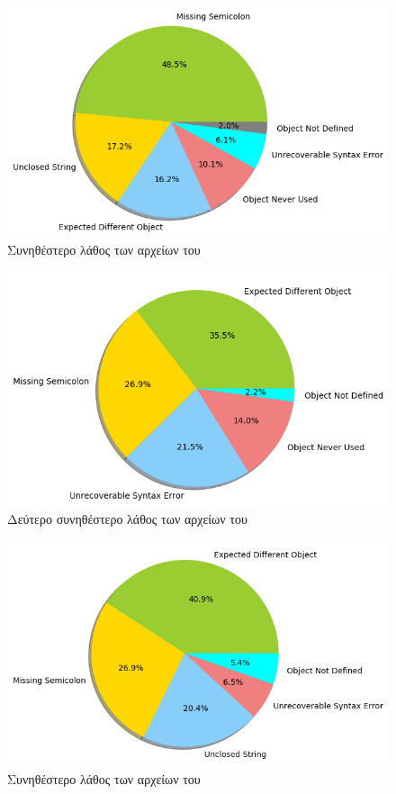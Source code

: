 \begin{figure}
	\caption{Συνηθέστερο λάθος των αρχείων του }
	\label{MCE1-npmchar}
	\includegraphics[width=\textwidth, keepaspectratio]{images/MCE-npmchar.png}
\end{figure}

\begin{figure}
	\caption{Δεύτερο συνηθέστερο λάθος των αρχείων του }
	\label{MCE2-npmchar}
	\includegraphics[width=\textwidth, keepaspectratio]{images/MCE2-npmchar.png}
\end{figure}

\begin{figure}
	\caption{Συνηθέστερο λάθος των αρχείων του }
	\label{MCE1-npmlabeled}
	\includegraphics[width=\textwidth, keepaspectratio]{images/MCE-npmlabeled.png}
\end{figure}

